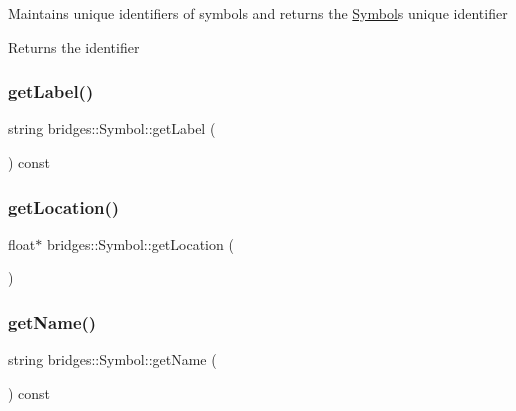 Maintains unique identifiers of symbols and returns the \mbox{\hyperlink{classbridges_1_1_symbol}{Symbol}}\textquotesingle{}s unique identifier

\begin{DoxyReturn}{Returns}
the identifier 
\end{DoxyReturn}
\mbox{\label{classbridges_1_1_symbol_a6d19ee38cdb8a07a19cf53840e93cbbb}} 
\subsubsection{\texorpdfstring{getLabel()}{getLabel()}}
{\footnotesize\ttfamily string bridges\+::\+Symbol\+::get\+Label (\begin{DoxyParamCaption}{ }\end{DoxyParamCaption}) const\hspace{0.3cm}{\ttfamily [inline]}}

\mbox{\label{classbridges_1_1_symbol_a97f8b30d76dd0d8dd49167628bb3f810}} 
\subsubsection{\texorpdfstring{getLocation()}{getLocation()}}
{\footnotesize\ttfamily float$\ast$ bridges\+::\+Symbol\+::get\+Location (\begin{DoxyParamCaption}{ }\end{DoxyParamCaption})\hspace{0.3cm}{\ttfamily [inline]}}

\mbox{\label{classbridges_1_1_symbol_a798c3871fe791a841ab0e558807e5c6b}} 
\subsubsection{\texorpdfstring{getName()}{getName()}}
{\footnotesize\ttfamily string bridges\+::\+Symbol\+::get\+Name (\begin{DoxyParamCaption}{ }\end{DoxyParamCaption}) const\hspace{0.3cm}{\ttfamily [inline]}}

